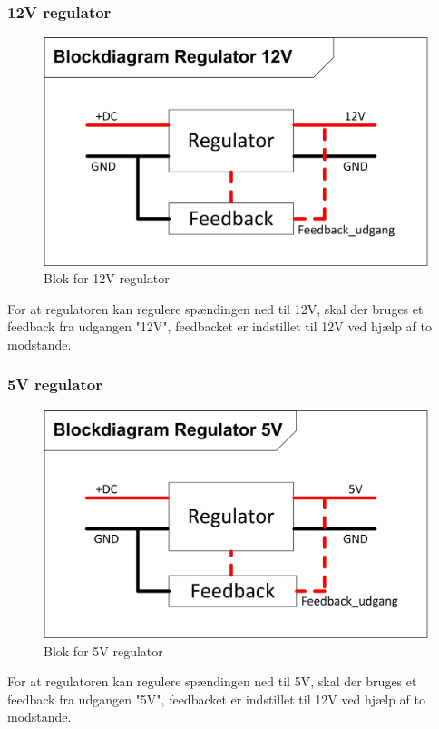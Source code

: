 \subsubsection{12V regulator}
\begin{figure}[H]
\centering
\includegraphics[scale=1]{billeder/Regulering_12VBlok}
\caption{Blok for 12V regulator}
\label{fig:Regulering_12VBlok}
\end{figure}
For at regulatoren kan regulere spændingen ned til 12V, skal der bruges et feedback fra udgangen "12V", feedbacket er indstillet til 12V ved hjælp af to modstande.
\newpage
\subsubsection{5V regulator}
\begin{figure}[H]
\centering
\includegraphics[scale=1]{billeder/Regulering_5VBlok}
\caption{Blok for 5V regulator}
\label{fig:Regulering_5VBlok}
\end{figure}
For at regulatoren kan regulere spændingen ned til 5V, skal der bruges et feedback fra udgangen "5V", feedbacket er indstillet til 12V ved hjælp af to modstande.


